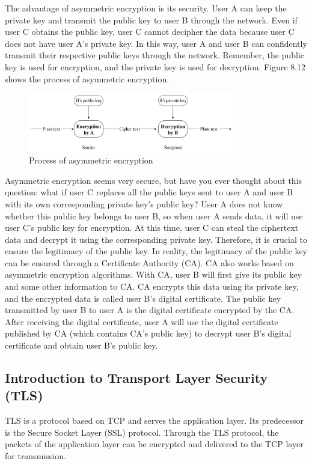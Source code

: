 \documentclass[a4paper,12pt,openany]{book}
\begin{document}
The advantage of asymmetric encryption is its security. User A can keep the private key and transmit the public key to user B through the network. Even if user C obtains the public key, user C cannot decipher the data because user C does not have user A’s private key. In this way, user A and user B can confidently transmit their respective public keys through the network. Remember, the public key is used for encryption, and the private key is used for decryption. Figure 8.12 shows the process of asymmetric encryption.

\begin{figure}[!h]
    \centering
    \includegraphics[width=0.8\textwidth]{D8Z/8-12}
    \caption{Process of asymmetric encryption}
\end{figure}

Asymmetric encryption seems very secure, but have you ever thought about this question: what if user C replaces all the public keys sent to user A and user B with its own corresponding private key’s public key? User A does not know whether this public key belongs to user B, so when user A sends data, it will use user C’s public key for encryption. At this time, user C can steal the ciphertext data and decrypt it using the corresponding private key. Therefore, it is crucial to ensure the legitimacy of the public key. In reality, the legitimacy of the public key can be ensured through a Certificate Authority (CA). CA also works based on asymmetric encryption algorithms. With CA, user B will first give its public key and some other information to CA. CA encrypts this data using its private key, and the encrypted data is called user B’s digital certificate. The public key transmitted by user B to user A is the digital certificate encrypted by the CA. After receiving the digital certificate, user A will use the digital certificate published by CA (which contains CA’s public key) to decrypt user B’s digital certificate and obtain user B’s public key.

\subsection{Introduction to Transport Layer Security (TLS)}
TLS is a protocol based on TCP and serves the application layer. Its predecessor is the Secure Socket Layer (SSL) protocol. Through the TLS protocol, the packets of the application layer can be encrypted and delivered to the TCP layer for transmission.
\end{document}
